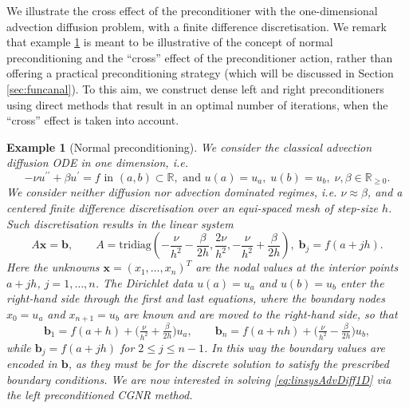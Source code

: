 \documentclass[hidelinks,onefignum,onetabnum]{siamart220329}
\newtheorem{example}{Example}
\let\vec\mathbf
\begin{document}
We illustrate the cross effect of the preconditioner with the one-dimensional advection diffusion problem, with a finite difference discretisation. We remark that example \ref{ex:cross-eyed} is meant to be illustrative of the concept of normal preconditioning and the ``cross'' effect of the preconditioner action, rather than offering a practical preconditioning strategy (which will be discussed in Section \ref{sec:funcanal}). To this aim, we construct dense left and right preconditioners using direct methods that result in an optimal number of iterations, when the ``cross'' effect is taken into account.
\begin{example}[{Normal preconditioning}]
    \label{ex:cross-eyed}
    We consider the classical advection diffusion ODE in one dimension, i.e.
    \begin{equation}
        \label{eq:advectionDiffusion1D}
        -\nu  u^{\prime\prime} + \beta u^\prime = f \text{ in }(a,b)\subset\mathbb{R}, \text{ and } u(a)=u_a,\; u(b)=u_b,\; \nu,\beta \in \mathbb{R}_{\geq 0}.
    \end{equation}
    We consider neither diffusion nor advection dominated regimes, i.e. $\nu\approx \beta$, and a centered finite difference discretisation over an equi-spaced mesh of step-size $h$.
    Such discretisation results in the linear system
    \begin{equation}
        \label{eq:linsysAdvDiff1D}
        A\vec{x} = \vec{b}, \qquad A=\text{tridiag}\left(-\frac{\nu}{h^2}- \frac{\beta}{2h}, \frac{2\nu}{h^2}, -\frac{\nu}{h^2}+\frac{\beta}{2h}\right),\; \vec{b}_j=f(a+jh).
    \end{equation}
    {Here the unknowns $\vec{x} = (x_1,\dots,x_n)^T$ are the nodal values at the interior points $a+jh$, $j=1,\dots,n$. The Dirichlet data $u(a)=u_a$ and $u(b)=u_b$ enter the right-hand side through the first and last equations, where the boundary nodes $x_0 = u_a$ and $x_{n+1} = u_b$ are known and are moved to the right-hand side, so that
    \begin{equation}
        \label{eq:linsysAdvDiff1Drhs}
        \vec{b}_1 = f(a+h) + \Big(\tfrac{\nu}{h^2}+\tfrac{\beta}{2h}\Big) u_a, \qquad
        \vec{b}_n = f(a+nh) + \Big(\tfrac{\nu}{h^2}-\tfrac{\beta}{2h}\Big) u_b,
    \end{equation}
    while $\vec{b}_j = f(a+jh)$ for $2\le j\le n-1$. In this way the boundary values are encoded in $\vec{b}$, as they must be for the discrete solution to satisfy the prescribed boundary conditions.}
    We are now interested in solving \eqref{eq:linsysAdvDiff1D} via the left preconditioned CGNR method.

\end{example}
\end{document}
